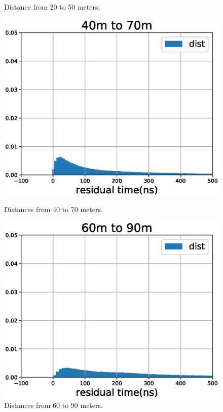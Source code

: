 \begin{figure}[H]
\begin{minipage}[b]{0.48\linewidth}
    \caption{Distance from 20 to 50 meters.}
    \label{subfig:res_time_r3}
  \end{minipage}
  \begin{minipage}[b]{0.48\linewidth}
    \centering
    \includegraphics[width=\textwidth]{./Figures/reco_plots/residual_time_hist_r5.eps}
    \caption{Distances from 40 to 70 meters.}
    \label{subfig:res_time_r5}
  \end{minipage}
  \hspace{0.1cm}
  \begin{minipage}[b]{0.48\linewidth}
    \centering
    \includegraphics[width=\textwidth]{./Figures/reco_plots/residual_time_hist_r7.eps}
    \caption{Distances from 60 to 90 meters.}
    \label{subfig:res_time_r7}
  \end{minipage}
\end{figure}


